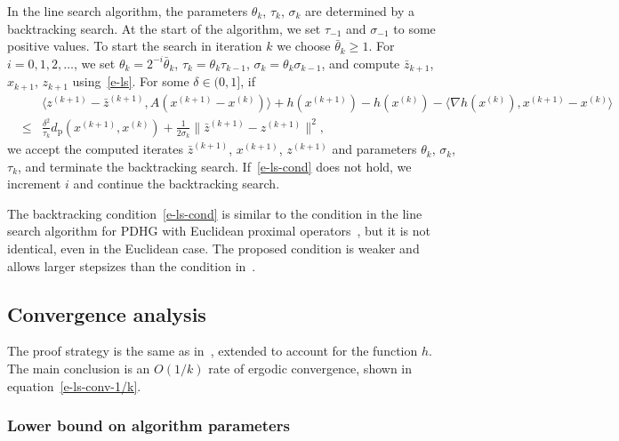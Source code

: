 \documentclass[letterpaper,11pt]{article}
\newcommand{\BEA}{\begin{eqnarray}}
\newcommand{\EEA}{\end{eqnarray}}
\newcommand{\inprod}[2]{\langle#1, #2\rangle}
\newcommand{\primal}{\mathrm p}
\begin{document}
In the line search algorithm, the parameters 
$\theta_k$, $\tau_k$, $\sigma_k$ are determined by a
backtracking search.
At the start of the algorithm, we set $\tau_{-1}$ and $\sigma_{-1}$ to
some positive values.
To start the search in iteration $k$ we choose
$\bar\theta_k \geq 1$.  For $i=0,1,2,\ldots$,
we set $\theta_k = 2^{-i}\bar\theta_k$,
$\tau_k=\theta_k\tau_{k-1}$, $\sigma_k=\theta_k\sigma_{k-1}$,
and compute $\bar z_{k+1}$, $x_{k+1}$, $z_{k+1}$ using~\eqref{e-ls}.
For some $\delta \in (0,1]$, if
\BEA
& & \inprod{z^{(k+1)}-\bar z^{(k+1)}}{A(x^{(k+1)}-x^{(k)})}
  +h(x^{(k+1)})-h(x^{(k)})-\inprod{\nabla h(x^{(k)})}{x^{(k+1)}-x^{(k)}}
  \nonumber \\
&\leq & \frac{\delta^2}{\tau_k} d_\primal(x^{(k+1)}, x^{(k)})
    + \frac{1}{2\sigma_k} \|\bar z^{(k+1)} - z^{(k+1)}\|^2,
    \label{e-ls-cond}
\EEA
we accept the computed iterates $\bar z^{(k+1)}$, $x^{(k+1)}$, $z^{(k+1)}$
and parameters $\theta_k$, $\sigma_k$, $\tau_k$, and terminate the 
backtracking search.
If~\eqref{e-ls-cond} does not hold, we increment $i$ and continue
the backtracking search.

The backtracking condition~\eqref{e-ls-cond} is similar to
the condition in the line search algorithm for PDHG with Euclidean proximal
operators~\cite[Algorithm~4]{MaP:18}, but it is not identical, even 
in the Euclidean case.
The proposed condition is weaker and allows larger stepsizes
than the condition in~\cite[Algorithm~4]{MaP:18}.

\subsection{Convergence analysis} \label{s-ls-conv}

The proof strategy is the same as in~\cite[Section~3.3]{JV22},
extended to account for the function $h$.
The main conclusion is an $O(1/k)$ rate of ergodic convergence,
shown in equation~\eqref{e-ls-conv-1/k}.

\subsubsection{Lower bound on algorithm parameters}
\end{document}
